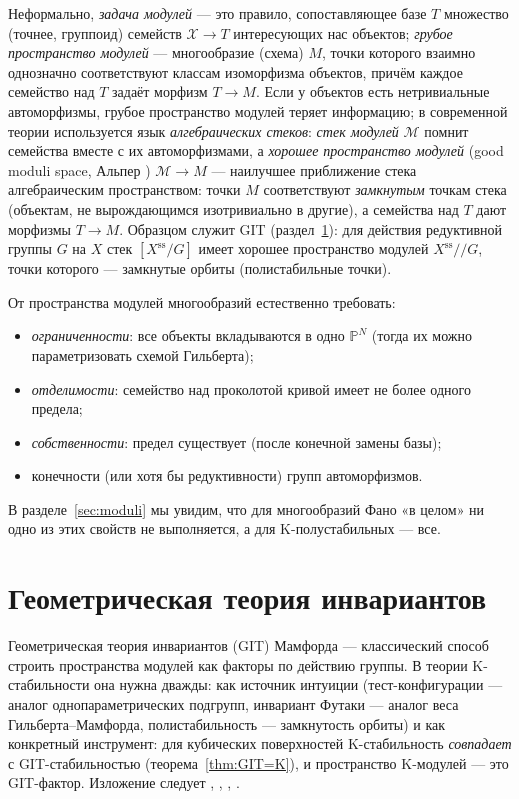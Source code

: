\documentclass[11pt,a4paper]{article}
\theoremstyle{plain}
\theoremstyle{definition}
\theoremstyle{remark}
\newcommand{\PP}{\mathbb{P}}
\newcommand{\cX}{\mathcal{X}}
\newcommand{\cM}{\mathcal{M}}
\newcommand{\ssl}{\mathrm{ss}}
\begin{document}
Неформально, \emph{задача модулей} --- это правило, сопоставляющее базе $T$ множество (точнее,
группоид) семейств $\cX\to T$ интересующих нас объектов; \emph{грубое пространство модулей} ---
многообразие (схема) $M$, точки которого взаимно однозначно соответствуют классам изоморфизма объектов,
причём каждое семейство над $T$ задаёт морфизм $T\to M$. Если у объектов есть нетривиальные
автоморфизмы, грубое пространство модулей теряет информацию; в современной теории используется язык \emph{алгебраических
стеков}: \emph{стек модулей} $\cM$ помнит семейства вместе с их автоморфизмами, а \emph{хорошее
пространство модулей} (good moduli space, Альпер \cite{Alper}) $\cM\to M$ --- наилучшее приближение
стека алгебраическим пространством: точки $M$ соответствуют \emph{замкнутым} точкам стека
(объектам, не вырождающимся изотривиально в другие), а семейства над $T$ дают морфизмы $T\to M$.
Образцом служит GIT (раздел~\ref{sec:git}): для действия редуктивной группы $G$ на $X$ стек
$[X^{\ssl}/G]$ имеет хорошее пространство модулей $X^{\ssl}/\!/G$, точки которого --- замкнутые
орбиты (полистабильные точки).

От пространства модулей многообразий естественно требовать:
\begin{itemize}
\item \emph{ограниченности}: все объекты вкладываются в одно $\PP^N$ (тогда их можно
параметризовать схемой Гильберта);
\item \emph{отделимости}: семейство над проколотой кривой имеет не более одного предела;
\item \emph{собственности}: предел существует (после конечной замены базы);
\item конечности (или хотя бы редуктивности) групп автоморфизмов.
\end{itemize}
В разделе~\ref{sec:moduli} мы увидим, что для многообразий Фано «в целом» ни одно из этих
свойств не выполняется, а для K-полустабильных --- все.

\section{Геометрическая теория инвариантов}\label{sec:git}

Геометрическая теория инвариантов (GIT) Мамфорда \cite{MFK} --- классический способ строить
пространства модулей как факторы по действию группы. В теории K-стабильности она нужна дважды:
как источник интуиции (тест-конфигурации --- аналог однопараметрических подгрупп, инвариант
Футаки --- аналог веса Гильберта--Мамфорда, полистабильность --- замкнутость орбиты) и как
конкретный инструмент: для кубических поверхностей K-стабильность \emph{совпадает} с
GIT-стабильностью (теорема~\ref{thm:GIT=K}), и пространство K-модулей --- это GIT-фактор.
Изложение следует \cite{MFK}, \cite{Dolg-IT}, \cite{Mukai}, \cite{PV}.
\end{document}
